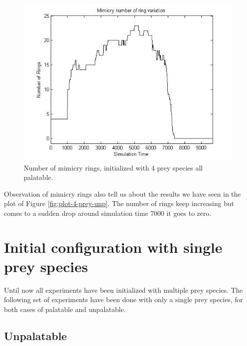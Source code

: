\begin{figure}[H]
	\centering
	\includegraphics[scale=0.50]{images/ringSize8k-4Prey-p}
	\caption{Number of mimicry rings, initialized with 4 prey species all palatable.}
	\label{fig:ringSize8k-4-Prey-p}
\end{figure}

Observation of mimicry rings also tell us about the results we have seen in the plot of Figure \ref{fig:plot-4-prey-unp}. The number of rings keep increasing but comes to a sudden drop around simulation time 7000 it goes to zero.

\section{Initial configuration with single prey species}
Until now all experiments have been initialized with multiple prey species. The following set of experiments have been done with only a single prey species, for both cases of palatable and unpalatable.

\subsection{Unpalatable}
\label{subsec:single-prey-unpalatable}

